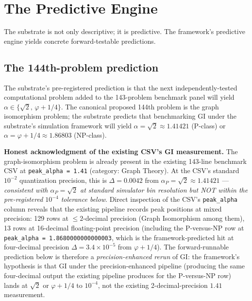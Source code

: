 \documentclass[11pt,a4paper]{amsart}
\theoremstyle{plain}
\theoremstyle{definition}
\begin{document}
\section{The Predictive Engine}\label{sec:predictive}

The substrate is not only descriptive; it is predictive. The framework's predictive engine yields concrete forward-testable predictions.

\subsection{The 144th-problem prediction}

The substrate's pre-registered prediction is that the next independently-tested computational problem added to the 143-problem benchmark panel will yield $\alpha\in\{\sqrt{2},\,\varphi+1/4\}$. The canonical proposed 144th problem is the graph isomorphism problem; the substrate predicts that benchmarking GI under the substrate's simulation framework will yield $\alpha = \sqrt{2}\approx 1.41421$ (P-class) or $\alpha = \varphi+1/4 \approx 1.86803$ (NP-class).

\textbf{Honest acknowledgment of the existing CSV's GI measurement.} The graph-isomorphism problem is already present in the existing 143-line benchmark CSV at \texttt{peak\_alpha = 1.41} (category: Graph Theory). At the CSV's standard $10^{-2}$ quantization precision, this is $\Delta = 0.0042$ from $\alpha_{P} = \sqrt{2} \approx 1.41421$ --- \emph{consistent with $\alpha_{P} = \sqrt{2}$ at standard simulator bin resolution but NOT within the pre-registered $10^{-4}$ tolerance below}. Direct inspection of the CSV's \texttt{peak\_alpha} column reveals that the existing pipeline records peak positions at mixed precision: 129 rows at $\le 2$-decimal precision (Graph Isomorphism among them), 13 rows at 16-decimal floating-point precision (including the P-versus-NP row at \texttt{peak\_alpha = 1.8680000000000003}, which is the framework-predicted hit at four-decimal precision $\Delta = 3.4 \times 10^{-5}$ from $\varphi + 1/4$). The forward-runnable prediction below is therefore a \emph{precision-enhanced rerun} of GI: the framework's hypothesis is that GI under the precision-enhanced pipeline (producing the same four-decimal output the existing pipeline produces for the P-versus-NP row) lands at $\sqrt{2}$ or $\varphi + 1/4$ to $10^{-4}$, not the existing 2-decimal-precision $1.41$ measurement.
\end{document}
